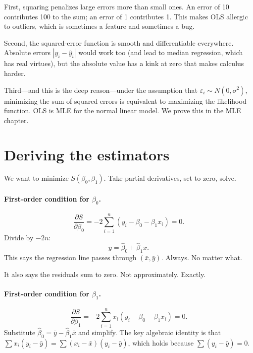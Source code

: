 First, squaring penalizes large errors more than small ones. An error of 10 contributes 100 to the sum; an error of 1 contributes 1. This makes OLS allergic to outliers, which is sometimes a feature and sometimes a bug.

Second, the squared-error function is smooth and differentiable everywhere. Absolute errors $|y_i - \hat{y}_i|$ would work too (and lead to median regression, which has real virtues), but the absolute value has a kink at zero that makes calculus harder.

Third---and this is the deep reason---under the assumption that $\varepsilon_i \sim N(0, \sigma^2)$, minimizing the sum of squared errors is equivalent to maximizing the likelihood function. OLS is MLE for the normal linear model. We prove this in the MLE chapter.

\section{Deriving the estimators}

We want to minimize $S(\beta_0, \beta_1)$. Take partial derivatives, set to zero, solve.

\paragraph{First-order condition for $\beta_0$.}
\begin{equation}
  \frac{\partial S}{\partial \beta_0} = -2\sum_{i=1}^{n}(y_i - \beta_0 - \beta_1 x_i) = 0.
  \label{eq:foc-b0}
\end{equation}
Divide by $-2n$:
\begin{equation}
  \bar{y} = \hat\beta_0 + \hat\beta_1 \bar{x}.
  \label{eq:line-means}
\end{equation}
This says the regression line passes through $(\bar{x}, \bar{y})$. Always. No matter what.

It also says the residuals sum to zero. Not approximately. Exactly.

\paragraph{First-order condition for $\beta_1$.}
\begin{equation}
  \frac{\partial S}{\partial \beta_1} = -2\sum_{i=1}^{n} x_i(y_i - \beta_0 - \beta_1 x_i) = 0.
  \label{eq:foc-b1}
\end{equation}
Substitute $\hat\beta_0 = \bar{y} - \hat\beta_1 \bar{x}$ and simplify. The key algebraic identity is that $\sum x_i(y_i - \bar{y}) = \sum (x_i - \bar{x})(y_i - \bar{y})$, which holds because $\sum(y_i - \bar{y}) = 0$.

